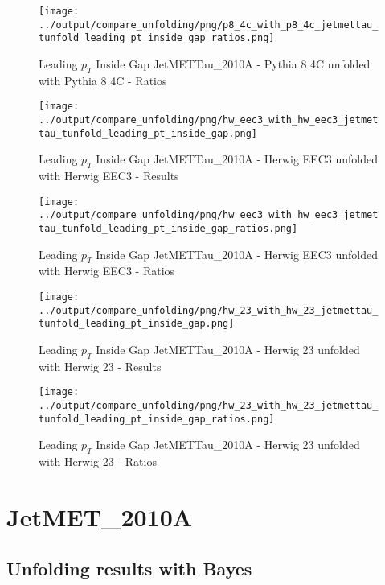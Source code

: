 \documentclass[11pt]{book}
\begin{document}
\begin{figure}[ht]
\centering
\texttt{[image: ../output/compare\_unfolding/png/p8\_4c\_with\_p8\_4c\_jetmettau\_tunfold\_leading\_pt\_inside\_gap\_ratios.png]}
\caption{Leading $p_{T}$ Inside Gap JetMETTau\_2010A - Pythia 8 4C unfolded with Pythia 8 4C - Ratios}
\label{p8_p8_jetmettau_tunfold_leading_pt_inside_gap_b}
\end{figure}

\begin{figure}[ht]
\centering
\texttt{[image: ../output/compare\_unfolding/png/hw\_eec3\_with\_hw\_eec3\_jetmettau\_tunfold\_leading\_pt\_inside\_gap.png]}
\caption{Leading $p_{T}$ Inside Gap JetMETTau\_2010A - Herwig EEC3 unfolded with Herwig EEC3 - Results}
\label{hw_eec3_hw_eec3_jetmettau_tunfold_leading_pt_inside_gap_a}
\end{figure}

\begin{figure}[ht]
\centering
\texttt{[image: ../output/compare\_unfolding/png/hw\_eec3\_with\_hw\_eec3\_jetmettau\_tunfold\_leading\_pt\_inside\_gap\_ratios.png]}
\caption{Leading $p_{T}$ Inside Gap JetMETTau\_2010A - Herwig EEC3 unfolded with Herwig EEC3 - Ratios}
\label{hw_eec3_hw_eec3_jetmettau_tunfold_leading_pt_inside_gap_b}
\end{figure}

\begin{figure}[ht]
\centering
\texttt{[image: ../output/compare\_unfolding/png/hw\_23\_with\_hw\_23\_jetmettau\_tunfold\_leading\_pt\_inside\_gap.png]}
\caption{Leading $p_{T}$ Inside Gap JetMETTau\_2010A - Herwig 23 unfolded with Herwig 23 - Results}
\label{hw_23_hw_23_jetmettau_tunfold_leading_pt_inside_gap_a}
\end{figure}

\begin{figure}[ht]
\centering
\texttt{[image: ../output/compare\_unfolding/png/hw\_23\_with\_hw\_23\_jetmettau\_tunfold\_leading\_pt\_inside\_gap\_ratios.png]}
\caption{Leading $p_{T}$ Inside Gap JetMETTau\_2010A - Herwig 23 unfolded with Herwig 23 - Ratios}
\label{hw_23_hw_23_jetmettau_tunfold_leading_pt_inside_gap_b}
\end{figure}


\section{JetMET\_2010A}
\subsection{Unfolding results with Bayes}
\end{document}
